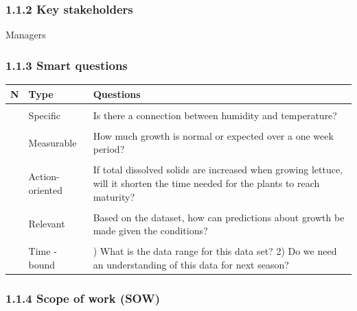 \documentclass[
]{article}
\begin{document}
\subsubsection{1.1.2 Key stakeholders}\label{key-stakeholders}

Managers

\subsubsection{1.1.3 Smart questions}\label{smart-questions}

\begin{longtable}[]{@{}
  >{\raggedright\arraybackslash}p{}
  >{\raggedright\arraybackslash}p{}
  >{\raggedright\arraybackslash}p{}@{}}
\toprule\noalign{}
\begin{minipage}[b]{\linewidth}\raggedright
N
\end{minipage} & \begin{minipage}[b]{\linewidth}\raggedright
Type
\end{minipage} & \begin{minipage}[b]{\linewidth}\raggedright
Questions
\end{minipage} \\
\midrule\noalign{}
\endhead
\bottomrule\noalign{}
\endlastfoot
& & \\
1 & Specific & Is there a connection between humidity and
temperature? \\
& & \\
2 & Measurable & How much growth is normal or expected over a one week
period? \\
& & \\
3 & Action-oriented & If total dissolved solids are increased when
growing lettuce, will it shorten the time needed for the plants to reach
maturity? \\
& & \\
4 & Relevant & Based on the dataset, how can predictions about growth be
made given the conditions? \\
& & \\
5 & Time - bound & 1) What is the data range for this data set? 2) Do we
need an understanding of this data for next season? \\
\end{longtable}

\subsubsection{1.1.4 Scope of work (SOW)}\label{scope-of-work-sow}
\end{document}
